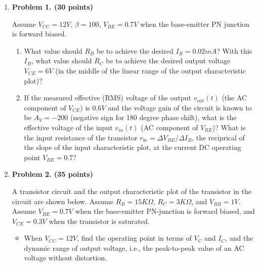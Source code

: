 \begin{enumerate}

\item {\bf Problem 1. (30 points)} 

Assume $V_{CC}=12V$, $\beta=100$, $V_{BE}=0.7V$ when the base-emitter PN 
junction is forward biased. 
\begin{enumerate}
\item What value should $R_B$ be to achieve the desired $I_B=0.02mA$?
With this $I_B$, what value should $R_C$ be to achieve the desired output
voltage $V_{CE}=6V$ (in the middle of the linear range of the output 
characteristic plot)?
\item If the measured effective (RMS) voltage of the output $v_{out}(t)$ 
  (the AC component of $V_{CE}$) is $0.6 V$ and the voltage gain of the
  circuit is known to be $A_V=-200$ (negative sign for 180 degree phase 
  shift), what is the effective voltage of the input $v_{in}(t)$ (AC
  component of $V_{BE}$)? What is the input resistance of the transistor
  $r_{be}=\Delta V_{BE}/\Delta I_B$, the reciprical of the slope of the 
  input characteristic plot, at the current DC operating point $V_{BE}=0.7$?
\end{enumerate}





\item {\bf Problem 2. (35 points)} 

A transistor circuit and the output characteristic plot of the transistor 
in the circuit are shown below. Assume $R_B=15 K\Omega$, $R_C=3 K\Omega$, 
and $V_{BB}=1 V$. Assume $V_{BE}=0.7 V$ when the base-emitter PN-junction 
is forward biased, and $V_{CE}=0.3 V$ when the transistor is saturated. 

\begin{itemize}
\item When $V_{CC}=12 V$, find the operating point in terms of $V_C$ 
  and $I_C$, and the dynamic range of output voltage, i.e., the 
  peak-to-peak value of an AC voltage without distortion. 


\end{itemize}
\end{enumerate}
